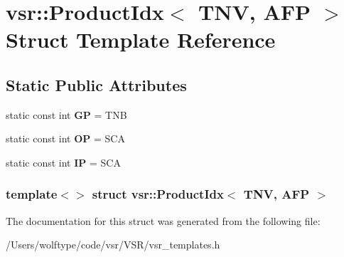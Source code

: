 \hypertarget{structvsr_1_1_product_idx_3_01_t_n_v_00_01_a_f_p_01_4}{\section{vsr\-:\-:Product\-Idx$<$ T\-N\-V, A\-F\-P $>$ Struct Template Reference}
\label{structvsr_1_1_product_idx_3_01_t_n_v_00_01_a_f_p_01_4}
}
\subsection*{Static Public Attributes}
\begin{DoxyCompactItemize}
\item 
\hypertarget{structvsr_1_1_product_idx_3_01_t_n_v_00_01_a_f_p_01_4_a780406955b3b6ef3b134cd8668f8b23a}{static const int {\bfseries G\-P} = T\-N\-B}\label{structvsr_1_1_product_idx_3_01_t_n_v_00_01_a_f_p_01_4_a780406955b3b6ef3b134cd8668f8b23a}

\item 
\hypertarget{structvsr_1_1_product_idx_3_01_t_n_v_00_01_a_f_p_01_4_a3b009defdfed2fecbce76294e8ca85c8}{static const int {\bfseries O\-P} = S\-C\-A}\label{structvsr_1_1_product_idx_3_01_t_n_v_00_01_a_f_p_01_4_a3b009defdfed2fecbce76294e8ca85c8}

\item 
\hypertarget{structvsr_1_1_product_idx_3_01_t_n_v_00_01_a_f_p_01_4_a129919fda3b2e14b8fe86aff196cb7d9}{static const int {\bfseries I\-P} = S\-C\-A}\label{structvsr_1_1_product_idx_3_01_t_n_v_00_01_a_f_p_01_4_a129919fda3b2e14b8fe86aff196cb7d9}

\end{DoxyCompactItemize}
\subsubsection*{template$<$$>$ struct vsr\-::\-Product\-Idx$<$ T\-N\-V, A\-F\-P $>$}



The documentation for this struct was generated from the following file\-:\begin{DoxyCompactItemize}
\item 
/\-Users/wolftype/code/vsr/\-V\-S\-R/vsr\-\_\-templates.\-h\end{DoxyCompactItemize}
